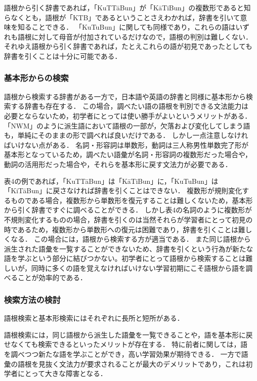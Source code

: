 \documentclass[technicalreport]{ieicej}
\begin{document}
語根から引く辞書であれば，「KuTTāBun」が「KāTiBun」の複数形であると知らなくとも，語根が「KTB」であるということさえわかれば，辞書を引いて意味を知ることできる．
「KuTuBun」に関しても同様であり，これらの語はいずれも語根に対して母音が付加されているだけなので，語根の判別は難しくない．
それゆえ語根から引く辞書であれば，たとえこれらの語が初見であったとしても辞書を引くことは十分に可能である．

\subsubsection{基本形からの検索}
語根から検索する辞書がある一方で，日本語や英語の辞書と同様に基本形から検索する辞書も存在する．
この場合，調べたい語の語根を判別できる文法能力は必要とならないため，初学者にとっては使い勝手がよいというメリットがある．
「NWM」のように派生語において語根の一部が，欠落および変化してしまう語も，単純にそのままの形で調べれば良いだけである．
しかし一点注意しなければいけない点がある．
名詞・形容詞は単数形，動詞は三人称男性単数完了形が基本形となっているため，調べたい語彙が名詞・形容詞の複数形だった場合や，動詞の活用形だった場合や，それらを基本形に戻す文法力が必要である．

表4の例であれば，「KuTT\=aBun」は「K\=aTiBun」に，「KuTuBun」は「KiT\=aBun」に戻さなければ辞書を引くことはできない．
複数形が規則変化するものである場合，複数形から単数形を復元することは難しくないため，基本形から引く辞書ですぐに調べることができる．
しかし表4の名詞のように複数形が不規則変化するものの場合，辞書を引くのは当然それらが学習者にとって初見の時であるため，複数形から単数形への復元は困難であり，辞書を引くことは難しくなる．
この場合には，語根から検索する方が適当である．
また同じ語根から派生された語彙を一覧することができないため、辞書を引くという行為が新たな語を学ぶという部分に結びつかない。初学者にとって語根から検索することは難しいが，同時に多くの語を覚えなければいけない学習初期にこそ語根から語を調べることが効率的である．

\subsubsection{検索方法の検討}
語根検索と基本形検索にはそれぞれに長所と短所がある．

語根検索には，同じ語根から派生した語彙を一覧できることや，語を基本形に戻せなくても検索できるといったメリットが存在する．
特に前者に関しては，語を調べつつ新たな語を学ぶことができ，高い学習効果が期待できる．
一方で語彙の語根を見抜く文法力が要求されることが最大のデメリットであり，これは初学者にとって大きな障害となる．
\end{document}
